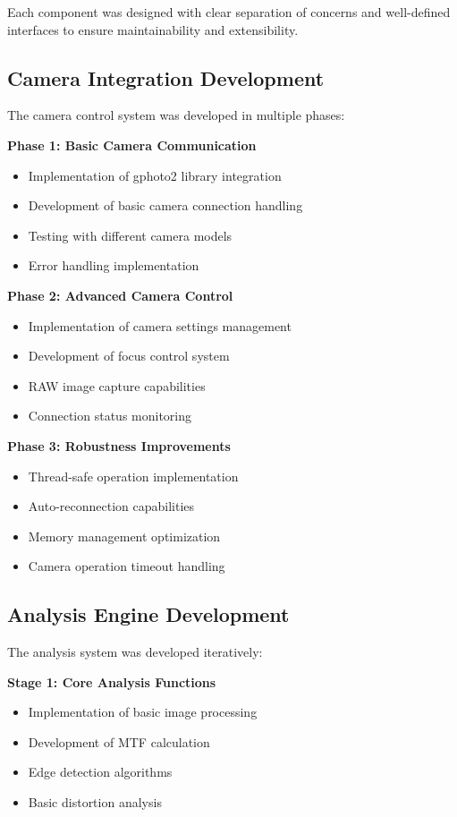 Each component was designed with clear separation of concerns and well-defined interfaces to ensure maintainability and extensibility.

\subsection{Camera Integration Development}
The camera control system was developed in multiple phases:

\textbf{Phase 1: Basic Camera Communication}
\begin{itemize}
    \item Implementation of gphoto2 library integration
    \item Development of basic camera connection handling
    \item Testing with different camera models
    \item Error handling implementation
\end{itemize}

\textbf{Phase 2: Advanced Camera Control}
\begin{itemize}
    \item Implementation of camera settings management
    \item Development of focus control system
    \item RAW image capture capabilities
    \item Connection status monitoring
\end{itemize}

\textbf{Phase 3: Robustness Improvements}
\begin{itemize}
    \item Thread-safe operation implementation
    \item Auto-reconnection capabilities
    \item Memory management optimization
    \item Camera operation timeout handling
\end{itemize}

\subsection{Analysis Engine Development}
The analysis system was developed iteratively:

\textbf{Stage 1: Core Analysis Functions}
\begin{itemize}
    \item Implementation of basic image processing
    \item Development of MTF calculation
    \item Edge detection algorithms
    \item Basic distortion analysis
\end{itemize}

